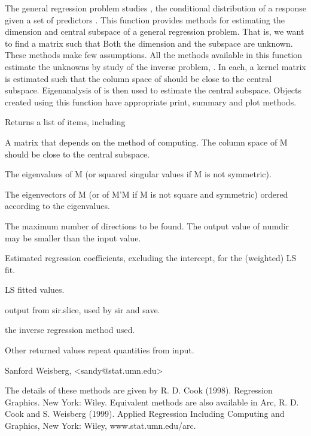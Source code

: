 \documentclass[letterpaper]{book}
\begin{document}
\begin{Details}\relax
The general regression problem studies , the conditional
distribution of a response  given a set of predictors .  
This function provides methods for estimating the dimension and central
subspace of a general regression problem.  That is, we want to find a 
 matrix  such that 
Both the dimension  and the subspace
 are unknown.  These methods make few assumptions.  All the methods
available in this function estimate the unknowns by study of the inverse
problem, .  In each, a kernel matrix  is estimated such
that the column space of  should be close to the central subspace.
Eigenanalysis of  is then used to estimate the central subspace.
Objects created using this function have appropriate print, summary and plot
methods.\end{Details}
\begin{Value}
Returns a list of items, including
\begin{ldescription}
\item[\code{M}] A matrix that depends on the method of computing.  The column space
of M should be close to the central subspace.
\item[\code{evalues}] The eigenvalues of M (or squared singular values if M is not
symmetric).
\item[\code{evectors}] The eigenvectors of M (or of M'M if M is not square and
symmetric) ordered according to the eigenvalues.
\item[\code{numdir}] The maximum number of directions to be found.  The output
value of numdir may be smaller than the input value.
\item[\code{ols.coef}] Estimated regression coefficients, excluding the intercept,
for the (weighted) LS fit.
\item[\code{ols.fit}] LS fitted values.
\item[\code{slice.info}] output from sir.slice, used by sir and save.
\item[\code{method}] the inverse regression method used.
\end{ldescription}

Other returned values repeat quantities from input.\end{Value}
\begin{Author}\relax
Sanford Weisberg, <sandy@stat.umn.edu>\end{Author}
\begin{References}\relax
The details of these methods are given by R. D. Cook (1998).  Regression
Graphics.  New York:  Wiley.  Equivalent methods are also available in Arc, R.
D. Cook and S. Weisberg (1999).  Applied Regression Including Computing and
Graphics, New York:  Wiley, www.stat.umn.edu/arc.\end{References}
\end{document}
